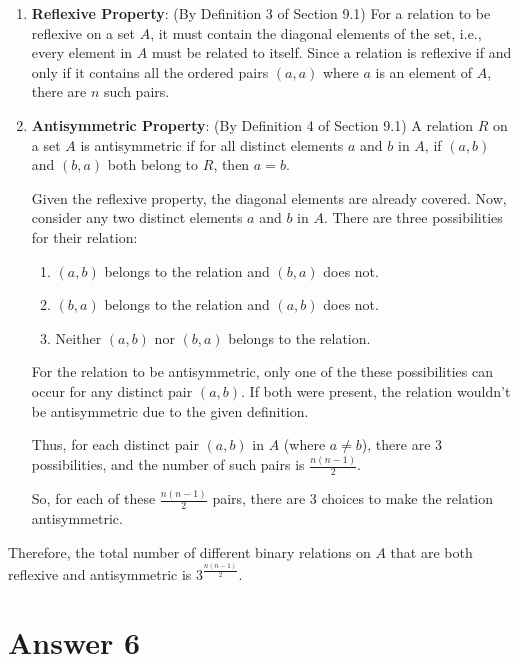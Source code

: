 \documentclass[12pt]{article}
\begin{document}
\begin{enumerate}
    \item \textbf{Reflexive Property}:
    (By Definition 3 of Section 9.1) For a relation to be reflexive on a set \( A \), it must contain the diagonal elements of the set, i.e., every element in \( A \) must be related to itself. Since a relation is reflexive if and only if it contains all the ordered pairs \( (a, a) \) where \( a \) is an element of \( A \), there are \( n \) such pairs.
    
    \item \textbf{Antisymmetric Property}:
    (By Definition 4 of Section 9.1) A relation \( R \) on a set \( A \) is antisymmetric if for all distinct elements \( a \) and \( b \) in \( A \), if \( (a, b) \) and \( (b, a) \) both belong to \( R \), then \( a = b \).
    
    Given the reflexive property, the diagonal elements are already covered. Now, consider any two distinct elements \( a \) and \( b \) in \( A \). There are three possibilities for their relation:
    
    \begin{enumerate}
        \item \( (a, b) \) belongs to the relation and \( (b, a) \) does not.
        \item \( (b, a) \) belongs to the relation and \( (a, b) \) does not.
        \item Neither \( (a, b) \) nor \( (b, a) \) belongs to the relation.
    \end{enumerate}
    
    For the relation to be antisymmetric, only one of the these possibilities can occur for any distinct pair \( (a, b) \). If both were present, the relation wouldn't be antisymmetric due to the given definition.
    
    Thus, for each distinct pair \( (a, b) \) in \( A \) (where \( a \neq b \)), there are 3 possibilities, and the number of such pairs is \( \frac{n(n-1)}{2} \). 
    
    So, for each of these \( \frac{n(n-1)}{2} \) pairs, there are 3 choices to make the relation antisymmetric.
\end{enumerate}

Therefore, the total number of different binary relations on \( A \) that are both reflexive and antisymmetric is \( 3^{\frac{n(n-1)}{2}} \).



\section*{Answer 6}
\end{document}
